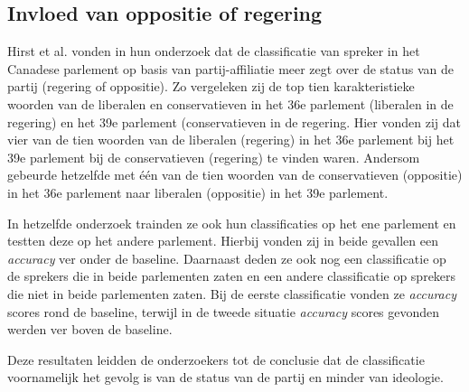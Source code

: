 \subsection{Invloed van oppositie of regering}
Hirst et al. vonden in hun onderzoek dat de classificatie van spreker in het Canadese parlement op basis van partij-affiliatie meer zegt over de status van de partij (regering of oppositie).\cite{Hirst_textto} Zo vergeleken zij de top tien karakteristieke woorden van de liberalen en conservatieven in het 36e parlement (liberalen in de regering) en het 39e parlement (conservatieven in de regering. Hier vonden zij dat vier van de tien woorden van de liberalen (regering) in het 36e parlement bij het 39e parlement bij de conservatieven (regering) te vinden waren. Andersom gebeurde hetzelfde met één van de tien woorden van de conservatieven (oppositie) in het 36e parlement naar liberalen (oppositie) in het 39e parlement.\par
In hetzelfde onderzoek trainden ze ook hun classificaties op het ene parlement en testten deze op het andere parlement. Hierbij vonden zij in beide gevallen een \textit{accuracy} ver onder de baseline. Daarnaast deden ze ook nog een classificatie op de sprekers die in beide parlementen zaten en een andere classificatie op sprekers die niet in beide parlementen zaten. Bij de eerste classificatie vonden ze \textit{accuracy} scores rond de baseline, terwijl in de tweede situatie \textit{accuracy} scores gevonden werden ver boven de baseline. \par
Deze resultaten leidden de onderzoekers tot de conclusie dat de classificatie voornamelijk het gevolg is van de status van de partij en minder van ideologie.\par



